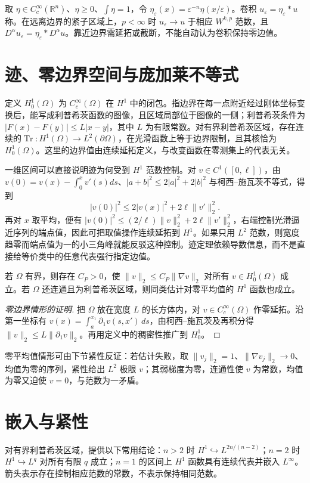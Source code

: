 \documentclass[UTF8,12pt,a4paper,fontset=fandol]{ctexbook}
\begin{document}
取 $\eta\in C_c^\infty(\mathbb R^n)$、$\eta\ge0$、$\int\eta=1$，令 $\eta_\varepsilon(x)=\varepsilon^{-n}\eta(x/\varepsilon)$。卷积 $u_\varepsilon=\eta_\varepsilon*u$ 称。在远离边界的紧子区域上，$p<\infty$ 时 $u_\varepsilon\to u$ 于相应 $W^{k,p}$ 范数，且 $D^\alpha u_\varepsilon=\eta_\varepsilon*D^\alpha u$。靠近边界需延拓或截断，不能自动认为卷积保持零边值。

\section{迹、零边界空间与庞加莱不等式}
定义 $H_0^1(\Omega)$ 为 $C_c^\infty(\Omega)$ 在 $H^1$ 中的闭包。指边界在每一点附近经过刚体坐标变换后，能写成利普希茨函数的图像，且区域局部位于图像的一侧；利普希茨条件为 $|F(x)-F(y)|\le L|x-y|$，其中 $L$ 为有限常数。对有界利普希茨区域，存在连续的$\operatorname{Tr}:H^1(\Omega)\to L^2(\partial\Omega)$，在光滑函数上等于边界限制，且其核恰为 $H_0^1(\Omega)$。这里的边界值由连续延拓定义，与改变函数在零测集上的代表无关。

一维区间可以直接说明迹为何受到 $H^1$ 范数控制。对 $v\in C^1([0,\ell])$，由 $v(0)=v(x)-\int_0^xv'(s)ds$、$|a+b|^2\le2|a|^2+2|b|^2$ 与柯西--施瓦茨不等式，得到
\[
 |v(0)|^2\le2|v(x)|^2+2\ell\|v'\|_2^2.
\]
再对 $x$ 取平均，便有 $|v(0)|^2\le(2/\ell)\|v\|_2^2+2\ell\|v'\|_2^2$，右端控制光滑逼近序列的端点值，因此可把取值操作连续延拓到 $H^1$。如果只用 $L^2$ 范数，则宽度趋零而端点值为一的小三角峰就能反驳这种控制。迹定理依赖导数信息，而不是直接给等价类中的任意代表强行指定边值。

\begin{theorem}[庞加莱不等式]
若 $\Omega$ 有界，则存在 $C_P>0$，使 $\|v\|_2\le C_P\|\nabla v\|_2$ 对所有 $v\in H_0^1(\Omega)$ 成立。若 $\Omega$ 还连通且为利普希茨区域，则同类估计对零平均值的 $H^1$ 函数也成立。
\end{theorem}
\begin{proof}[零边界情形的证明]
把 $\Omega$ 放在宽度 $L$ 的长方体内，对 $v\in C_c^\infty(\Omega)$ 作零延拓。沿第一坐标有 $v(x)=\int_a^{x_1}\partial_1v(s,x')\,ds$，由柯西--施瓦茨及再积分得 $\|v\|_2\le L\|\partial_1v\|_2$。再用定义中的稠密性推广到 $H_0^1$。
\end{proof}
零平均值情形可由下节紧性反证：若估计失败，取 $\|v_j\|_2=1$、$\|\nabla v_j\|_2\to0$、均值为零的序列，紧性给出 $L^2$ 极限 $v$；其弱梯度为零，连通性使 $v$ 为常数，均值为零又迫使 $v=0$，与范数为一矛盾。

\section{嵌入与紧性}
对有界利普希茨区域，提供以下常用结论：$n>2$ 时 $H^1\hookrightarrow L^{2n/(n-2)}$；$n=2$ 时 $H^1\hookrightarrow L^q$ 对所有有限 $q$ 成立；$n=1$ 的区间上 $H^1$ 函数具有连续代表并嵌入 $L^\infty$。箭头表示存在控制相应范数的常数，不表示保持相同范数。
\end{document}
